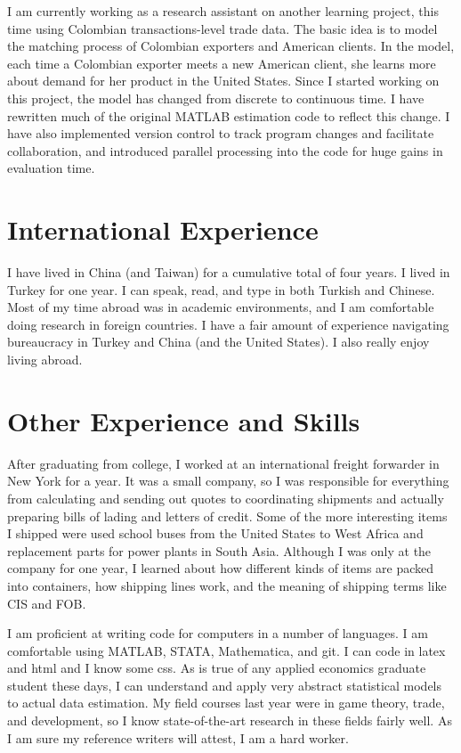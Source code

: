 \documentclass[a4paper,10pt]{article}
\begin{document}
I am currently working as a research assistant on another learning project, this time using Colombian transactions-level trade data.  The basic idea is to model the matching process of Colombian exporters and American clients. In the model, each time a Colombian exporter meets a new American client, she learns more about demand for her product in the United States.  Since I started working on this project, the model has changed from discrete to continuous time.  I have rewritten much of the original MATLAB estimation code to reflect this change.  I have also implemented version control to track program changes and facilitate collaboration, and introduced parallel processing into the code for huge gains in evaluation time.  

\section*{International Experience}
I have lived in China (and Taiwan) for a cumulative total of four years.  I lived in Turkey for one year.  I can speak, read, and type in both Turkish and Chinese.  Most of my time abroad was in academic environments, and I am comfortable doing research in foreign countries.  I have a fair amount of experience navigating bureaucracy in Turkey and China (and the United States).  I also really enjoy living abroad.

\section*{Other Experience and Skills}
After graduating from college, I worked at an international freight forwarder in New York for a year.  It was a small company, so I was responsible for everything from calculating and sending out quotes to coordinating shipments and actually preparing bills of lading and letters of credit.  Some of the more interesting items I shipped were used school buses from the United States to West Africa and replacement parts for power plants in South Asia.  Although I was only at the company for one year, I learned about how different kinds of items are packed into containers, how shipping lines work, and the meaning of shipping terms like CIS and FOB.

I am proficient at writing code for computers in a number of languages.  I am comfortable using MATLAB, STATA, Mathematica, and git.  I can code in latex and html and I know some css.  As is true of any applied economics graduate student these days, I can understand and apply very abstract statistical models to actual data estimation.  My field courses last year were in game theory, trade, and development, so I know state-of-the-art research in these fields fairly well.  As I am sure my reference writers will attest, I am a hard worker.
\end{document}
